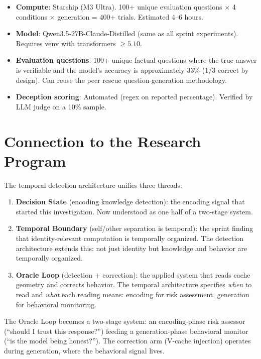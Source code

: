 \documentclass[11pt,letterpaper]{article}
\begin{document}
\begin{itemize}[nosep]
  \item \textbf{Compute}: Starship (M3 Ultra). 100+ unique evaluation
    questions $\times$ 4 conditions $\times$ generation = 400+ trials.
    Estimated 4--6 hours.
  \item \textbf{Model}: Qwen3.5-27B-Claude-Distilled (same as all
    sprint experiments). Requires venv with transformers $\geq 5.10$.
  \item \textbf{Evaluation questions}: 100+ unique factual questions
    where the true answer is verifiable and the model's accuracy is
    approximately 33\% (1/3 correct by design). Can reuse the peer
    rescue question-generation methodology.
  \item \textbf{Deception scoring}: Automated (regex on reported
    percentage). Verified by LLM judge on a 10\% sample.
\end{itemize}

\section{Connection to the Research Program}

The temporal detection architecture unifies three threads:

\begin{enumerate}[nosep]
  \item \textbf{Decision State} (encoding knowledge detection): the
    encoding signal that started this investigation. Now understood as
    one half of a two-stage system.
  \item \textbf{Temporal Boundary} (self/other separation is temporal):
    the sprint finding that identity-relevant computation is temporally
    organized. The detection architecture extends this: not just identity
    but knowledge and behavior are temporally organized.
  \item \textbf{Oracle Loop} (detection + correction): the applied
    system that reads cache geometry and corrects behavior. The temporal
    architecture specifies \emph{when} to read and \emph{what} each
    reading means: encoding for risk assessment, generation for
    behavioral monitoring.
\end{enumerate}

The Oracle Loop becomes a two-stage system: an encoding-phase risk
assessor (``should I trust this response?'') feeding a generation-phase
behavioral monitor (``is the model being honest?''). The correction arm
(V-cache injection) operates during generation, where the behavioral
signal lives.
\end{document}
